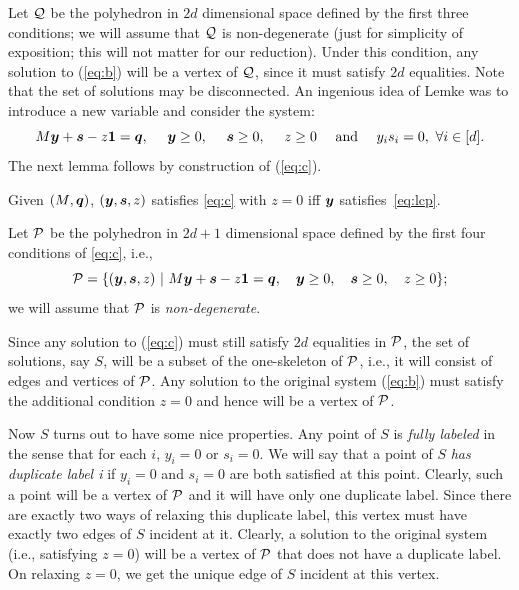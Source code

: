 Let $\mbox{${\mathcal Q}$}$ be the polyhedron in $2d$ dimensional space defined by the first three conditions; we will assume that $\mbox{${\mathcal Q}$}$ is
non-degenerate (just for simplicity of exposition; this will not matter for our reduction).  
Under this condition, any solution to (\ref{eq:b}) will be a vertex of $\mbox{${\mathcal Q}$}$, since it must satisfy $2d$
equalities. Note that the set of solutions may be disconnected.
%
An ingenious idea of Lemke was to introduce a new variable and consider the system:
\begin{equation} \label{eq:c} \mbox{$M$} \mbox{\boldmath $y$}  + \mbox{\boldmath $s$} -z \mbox{\boldmath $1$}  = \mbox{\boldmath $q$}, \ \ \ \  \mbox{\boldmath $y$} \geq 0, \ \ \ \ \mbox{\boldmath $s$} \geq 0, \ \ \ \  z \geq 0  \ \
\ \ \mbox{and} \ \ \ \ y_is_i = 0,\ \forall i\in[d].  \end{equation}
The next lemma follows by construction of (\ref{eq:c}).
\begin{lemma}\label{lem:lemke1}
Given $(\mbox{$M$},\mbox{\boldmath $q$})$, $(\mbox{\boldmath $y$},\mbox{\boldmath $s$},z)$ satisfies \eqref{eq:c} with $z=0$ iff $\mbox{\boldmath $y$}$ satisfies~\eqref{eq:lcp}.
\end{lemma}
%
Let $\mbox{${\mathcal P}$}$ be the polyhedron in $2d + 1$ dimensional space defined by the first four conditions of \eqref{eq:c}, i.e.,
\begin{equation}\label{eq:cp}
\mbox{${\mathcal P}$} = \{ (\mbox{\boldmath $y$},\mbox{\boldmath $s$}, z) \ |\ \mbox{$M$} \mbox{\boldmath $y$}  + \mbox{\boldmath $s$} -z \mbox{\boldmath $1$}  = \mbox{\boldmath $q$}, \ \ \ \mbox{\boldmath $y$} \geq 0, \ \ \ \mbox{\boldmath $s$} \geq 0, \ \ \  z \geq 0\};
\end{equation}
we will assume that $\mbox{${\mathcal P}$}$ is {\em non-degenerate}.  

Since any solution to (\ref{eq:c}) must still satisfy $2d$ equalities in $\mbox{${\mathcal P}$}$, the set of solutions, say
$S$, will be a subset of the one-skeleton of $\mbox{${\mathcal P}$}$, i.e., it will consist of edges and vertices of $\mbox{${\mathcal P}$}$.  Any solution to
the original system (\ref{eq:b}) must satisfy the additional condition $z = 0$ and hence will be a vertex of $\mbox{${\mathcal P}$}$.

Now $S$ turns out to have some nice properties. Any point of $S$ is {\em fully labeled} in the sense that for each $i$, $y_i
= 0$ or $s_i = 0$.  We will say that a point of $S$ {\em has duplicate label i} if $y_i = 0$ and $s_i = 0$ are both satisfied
at this point. Clearly, such a point will be a vertex of $\mbox{${\mathcal P}$}$ and it will have only one duplicate label.  Since there are
exactly two ways of relaxing this duplicate label, this vertex must have exactly two edges of $S$ incident at it.  Clearly, a
solution to the original system (i.e., satisfying $z = 0$) will be a vertex of $\mbox{${\mathcal P}$}$ that does not have a duplicate label.  On
relaxing $z=0$, we get the unique edge of $S$ incident at this vertex.

